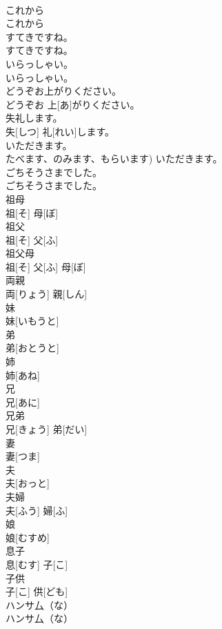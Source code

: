 \documentclass[8pt]{extreport}
\begin{document}
\begin{CJK}{UTF8}{min}
\\	これから	
\\	これから		
\\	[～、]すてきですね。	
\\	[～、]すてきですね。		
\\	いらっしゃい。	
\\	いらっしゃい。		
\\	どうぞお上がりください。	
\\	どうぞお 上[あ]がりください。		
\\	失礼します。	
\\	失[しつ] 礼[れい]します。		
\\	いただきます。	
\\	たべます、のみます、もらいます)	いただきます。		
\\	ごちそうさまでした。	
\\	ごちそうさまでした。		
\\	祖母	
\\	祖[そ] 母[ぼ]		
\\	祖父	
\\	祖[そ] 父[ふ]		
\\	祖父母	
\\	祖[そ] 父[ふ] 母[ぼ]		
\\	両親	
\\	両[りょう] 親[しん]		
\\	妹	
\\	妹[いもうと]		
\\	弟	
\\	弟[おとうと]		
\\	姉	
\\	姉[あね]		
\\	兄	
\\	兄[あに]		
\\	兄弟	
\\	兄[きょう] 弟[だい]		
\\	妻	
\\	妻[つま]		
\\	夫	
\\	夫[おっと]		
\\	夫婦	
\\	夫[ふう] 婦[ふ]		
\\	娘	
\\	娘[むすめ]		
\\	息子	
\\	息[むす] 子[こ]		
\\	子供	
\\	子[こ] 供[ども]		
\\	ハンサ厶（な）	
\\	ハンサ厶（な）		

\end{CJK}
\end{document}
